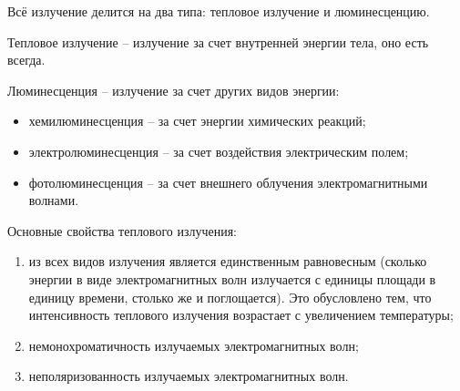 \documentclass{hedexams}
\begin{document}
    \tableofcontents

Всё излучение делится на два типа: тепловое излучение и люминесценцию.

Тепловое излучение -- излучение за счет внутренней энергии тела, оно есть
всегда.

Люминесценция -- излучение за счет других видов энергии:
\begin{itemize}
    \item хемилюминесценция -- за счет энергии химических реакций;
    \item электролюминесценция -- за счет воздействия электрическим полем;
    \item фотолюминесценция -- за счет внешнего облучения электромагнитными
        волнами.
\end{itemize}

Основные свойства теплового излучения:
\begin{enumerate}
    \item из всех видов излучения является единственным равновесным (сколько
        энергии в виде электромагнитных волн излучается с единицы площади
        в единицу времени, столько же и поглощается). Это обусловлено тем,
        что интенсивность теплового излучения возрастает с увеличением
        температуры;
    \item немонохроматичность излучаемых электромагнитных волн;
    \item неполяризованность излучаемых электромагнитных волн.
\end{enumerate}
\end{document}
